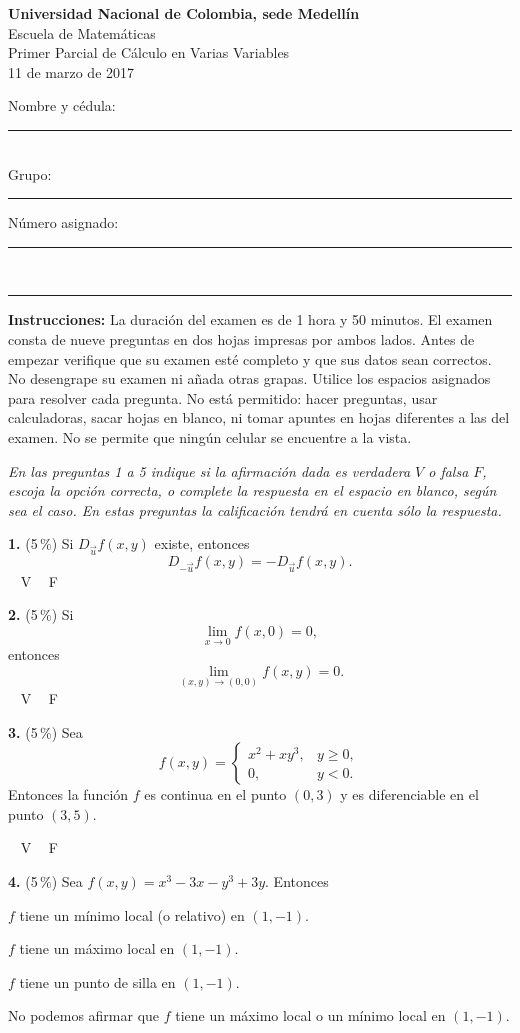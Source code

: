 \documentclass[11pt]{article}
\newcommand{\examheader}{%
  \noindent
  \begin{minipage}[t]{0.62\linewidth}
    {\bfseries\large Universidad Nacional de Colombia, sede Medell\'in}\\
    {\small Escuela de Matem\'aticas}\\
    {\small Primer Parcial de C\'alculo en Varias Variables}\\
    {\small 11 de marzo de 2017}
  \end{minipage}%
  \hfill
  \begin{minipage}[t]{0.33\linewidth}
    \raggedleft\small
    Nombre y c\'edula: \rule{2.8cm}{0.4pt}\\[4pt]
    Grupo: \rule{1.5cm}{0.4pt} \quad N\'umero asignado: \rule{1.5cm}{0.4pt}
  \end{minipage}\\[4pt]
  \rule{\linewidth}{0.6pt}
}
\begin{document}
\examheader

\textbf{Instrucciones:} La duraci\'on del examen es de 1 hora y 50 minutos. El examen consta de nueve preguntas en dos hojas impresas por ambos lados. Antes de empezar verifique que su examen est\'e completo y que sus datos sean correctos. No desengrape su examen ni a\~nada otras grapas. Utilice los espacios asignados para resolver cada pregunta. No est\'a permitido: hacer preguntas, usar calculadoras, sacar hojas en blanco, ni tomar apuntes en hojas diferentes a las del examen. No se permite que ning\'un celular se encuentre a la vista.

\bigskip

\textit{En las preguntas 1 a 5 indique si la afirmaci\'on dada es verdadera $\boxed{V}$ o falsa $\boxed{F}$, escoja la opci\'on correcta, o complete la respuesta en el espacio en blanco, seg\'un sea el caso. En estas preguntas la calificaci\'on tendr\'a en cuenta s\'olo la respuesta.}

\bigskip
\noindent\textbf{1.} (5\,\%) Si $D_{\vec u}f(x,y)$ existe, entonces
$$D_{-\vec u}f(x,y) = -D_{\vec u}f(x,y).$$
\hspace{2cm}$\boxed{\phantom{V}}$ V \qquad $\boxed{\phantom{V}}$ F

\bigskip
\noindent\textbf{2.} (5\,\%) Si
$$\lim_{x\to 0} f(x,0) = 0,$$
entonces
$$\lim_{(x,y)\to(0,0)} f(x,y) = 0.$$
\hspace{2cm}$\boxed{\phantom{V}}$ V \qquad $\boxed{\phantom{V}}$ F

\bigskip
\noindent\textbf{3.} (5\,\%) Sea
$$
f(x,y)=
\begin{cases}
x^2+xy^3, & y\geq 0,\\
0, & y<0.
\end{cases}
$$
Entonces la funci\'on $f$ es continua en el punto $(0,3)$ y es diferenciable en el punto $(3,5)$.

\hspace{2cm}$\boxed{\phantom{V}}$ V \qquad $\boxed{\phantom{V}}$ F

\bigskip
\noindent\textbf{4.} (5\,\%) Sea $f(x,y)=x^3-3x-y^3+3y$. Entonces

\begin{opciones}
  \item $f$ tiene un m\'inimo local (o relativo) en $(1,-1)$.
  \item $f$ tiene un m\'aximo local en $(1,-1)$.
  \item $f$ tiene un punto de silla en $(1,-1)$.
  \item No podemos afirmar que $f$ tiene un m\'aximo local o un m\'inimo local en $(1,-1)$.
\end{opciones}
\end{document}
